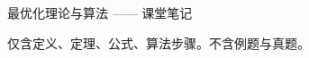 \documentclass[10pt,a4paper,twocolumn]{ctexart}
\begin{document}
\begin{center}
{\Large 最优化理论与算法 —— 课堂笔记}

\vspace{2pt}
{\small 仅含定义、定理、公式、算法步骤。不含例题与真题。}
\end{center}

\vspace{6pt}










\end{document}
